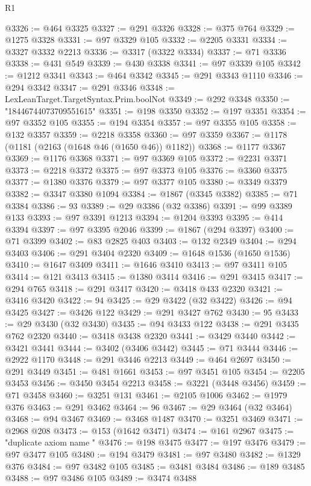 \begin{lexlean}{R1}
\begin{coremodule}
@3326 := @464 @3325
@3327 := @291 @3326
@3328 := @375 @764
@3329 := @1275 @3328
@3331 := @97 @3329 @105
@3332 := @2205 @3331
@3334 := @3327 @3332 @2213
@3336 := @3317 (@3322 @3334)
@3337 := @71 @3336
@3338 := @431 @549
@3339 := @430 @3338
@3341 := @97 @3339 @105
@3342 := @1212 @3341
@3343 := @464 @3342
@3345 := @291 @3343 @1110
@3346 := @294 @3342
@3347 := @291 @3346
@3348 := LexLeanTarget.TargetSyntax.Prim.boolNot
@3349 := @292 @3348
@3350 := "18446744073709551615"
@3351 := @198 @3350
@3352 := @197 @3351
@3354 := @97 @3352 @105
@3355 := @194 @3354
@3357 := @97 @3355 @105
@3358 := @132 @3357
@3359 := @2218 @3358
@3360 := @97 @3359
@3367 := @1178 (@1181 (@2163 (@1648 @46 (@1650 @46)) @1182))
@3368 := @1177 @3367
@3369 := @1176 @3368
@3371 := @97 @3369 @105
@3372 := @2231 @3371
@3373 := @2218 @3372
@3375 := @97 @3373 @105
@3376 := @3360 @3375
@3377 := @1380 @3376
@3379 := @97 @3377 @105
@3380 := @3349 @3379
@3382 := @3347 @3380 @1094
@3384 := @1867 (@3345 @3382)
@3385 := @71 @3384
@3386 := 93
@3389 := @29 @3386 (@32 @3386)
@3391 := @99 @3389 @133
@3393 := @97 @3391 @1213
@3394 := @1204 @3393
@3395 := @414 @3394
@3397 := @97 @3395 @2046
@3399 := @1867 (@294 @3397)
@3400 := @71 @3399
@3402 := @83 @2825 @403
@3403 := @132 @2349
@3404 := @294 @3403
@3406 := @291 @3404 @2320
@3409 := @1648 @1536 (@1650 @1536)
@3410 := @1647 @3409
@3411 := @1646 @3410
@3413 := @97 @3411 @105
@3414 := @121 @3413
@3415 := @1380 @3414
@3416 := @291 @3415
@3417 := @294 @765
@3418 := @291 @3417
@3420 := @3418 @433 @2320
@3421 := @3416 @3420
@3422 := 94
@3425 := @29 @3422 (@32 @3422)
@3426 := @94 @3425
@3427 := @3426 @122
@3429 := @291 @3427 @762
@3430 := 95
@3433 := @29 @3430 (@32 @3430)
@3435 := @94 @3433 @122
@3438 := @291 @3435 @762 @2320
@3440 := @3418 @3438 @2320
@3441 := @3429 @3440
@3442 := @3421 @3441
@3444 := @3402 (@3406 @3442)
@3445 := @71 @3444
@3446 := @2922 @1170
@3448 := @291 @3446 @2213
@3449 := @464 @2697
@3450 := @291 @3449
@3451 := @481 @1661
@3453 := @97 @3451 @105
@3454 := @2205 @3453
@3456 := @3450 @3454 @2213
@3458 := @3221 (@3448 @3456)
@3459 := @71 @3458
@3460 := @3251 @131
@3461 := @2105 @1006
@3462 := @1979 @376
@3463 := @291 @3462
@3464 := 96
@3467 := @29 @3464 (@32 @3464)
@3468 := @94 @3467
@3469 := @3468 @1487
@3470 := @3251 @3469
@3471 := @2968 @208
@3473 := @153 (@1642 @3471)
@3474 := @161 @2967
@3475 := "duplicate axiom name "
@3476 := @198 @3475
@3477 := @197 @3476
@3479 := @97 @3477 @105
@3480 := @194 @3479
@3481 := @97 @3480
@3482 := @1329 @376
@3484 := @97 @3482 @105
@3485 := @3481 @3484
@3486 := @189 @3485
@3488 := @97 @3486 @105
@3489 := @3474 @3488

\end{coremodule}
\end{lexlean}
